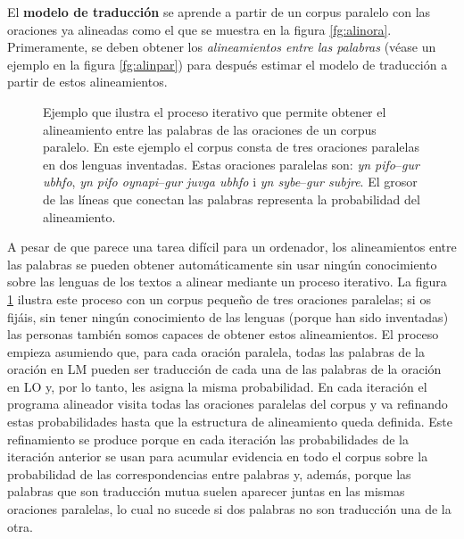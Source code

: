 El \textbf{modelo de traducción} se aprende a partir de un corpus paralelo con las oraciones ya alineadas como el que se muestra en la figura \ref{fg:alinora}. Primeramente, se deben obtener los \emph{alineamientos entre las palabras} (véase un ejemplo en la figura \ref{fg:alinpar}) para después estimar el modelo de traducción a partir de estos alineamientos. 

\begin{figure}[tb] \centering {} 

%


 \caption{Ejemplo que ilustra el proceso iterativo que permite obtener el alineamiento entre las palabras de las oraciones de un corpus paralelo. En este ejemplo el corpus consta de tres oraciones paralelas en dos lenguas inventadas. Estas oraciones paralelas son: \emph{yn pifo}--\emph{gur ubhfo}, \emph{yn pifo oynapi}--\emph{gur juvga ubhfo} i \emph{yn sybe}--\emph{gur subjre}. El grosor de las líneas que conectan las palabras representa la probabilidad del alineamiento.} \label{fg:pasosalin} \end{figure} 

A pesar de que parece una tarea difícil para un ordenador, los alineamientos entre las palabras se pueden obtener automáticamente sin usar ningún conocimiento sobre las lenguas de los textos a alinear mediante un proceso iterativo. La figura \ref{fg:pasosalin} ilustra este proceso con un corpus pequeño de tres oraciones paralelas; si os fijáis, sin tener ningún conocimiento de las lenguas (porque han sido inventadas) las personas también somos capaces de obtener estos alineamientos. El proceso empieza asumiendo que, para cada oración paralela, todas las palabras de la oración en LM pueden ser traducción de cada una de las palabras de la oración en LO y, por lo tanto, les asigna la misma probabilidad. En cada iteración el programa alineador visita todas las oraciones paralelas del corpus y va refinando estas probabilidades hasta que la estructura de alineamiento queda definida. Este refinamiento se produce porque en cada iteración las probabilidades de la iteración anterior se usan para acumular evidencia en todo el corpus sobre la probabilidad de las correspondencias entre palabras y, además, porque las palabras que son traducción mutua suelen aparecer juntas en las mismas oraciones paralelas, lo cual no sucede si dos palabras no son traducción una de la otra. 

